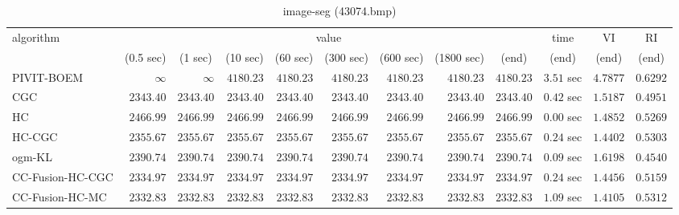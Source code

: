 \begin{table}[H]
\scriptsize
\centering
\caption{image-seg (43074.bmp)}
\label{tab:anytimetable-image-seg-43074.bmp}
\begin{tabular}{lrrrrrrrrrrr}
\toprule
           algorithm &                                   \multicolumn{8}{c}{value} & \multicolumn{1}{c}{time}    & \multicolumn{1}{c}{VI}  & \multicolumn{1}{c}{RI} \\  
\cmidrule(lr){2-9}\cmidrule(lr){10-10} \cmidrule(lr){11-11} \cmidrule(lr){12-12}   
                     & \multicolumn{1}{c}{(0.5 sec)} & \multicolumn{1}{c}{(1 sec)} & \multicolumn{1}{c}{(10 sec)} & \multicolumn{1}{c}{(60 sec)} & \multicolumn{1}{c}{(300 sec)} & \multicolumn{1}{c}{(600 sec)} & \multicolumn{1}{c}{(1800 sec)} & \multicolumn{1}{c}{(end)} & \multicolumn{1}{c}{(end)}    & \multicolumn{1}{c}{(end)}   & \multicolumn{1}{c}{(end)}  \\ \midrule 
          PIVIT-BOEM & $\infty$ & $\infty$ & $      4180.23$ & $      4180.23$ & $      4180.23$ & $      4180.23$ & $      4180.23$ & $      4180.23$ & $         3.51$ sec    & $       4.7877$  & $       0.6292$ \\ 
                 CGC & $      2343.40$ & $      2343.40$ & $      2343.40$ & $      2343.40$ & $      2343.40$ & $      2343.40$ & $      2343.40$ & $      2343.40$ & $         0.42$ sec    & $       1.5187$  & $       0.4951$ \\ 
                  HC & $      2466.99$ & $      2466.99$ & $      2466.99$ & $      2466.99$ & $      2466.99$ & $      2466.99$ & $      2466.99$ & $      2466.99$ & $         0.00$ sec    & $       1.4852$  & $       0.5269$ \\ 
              HC-CGC & $      2355.67$ & $      2355.67$ & $      2355.67$ & $      2355.67$ & $      2355.67$ & $      2355.67$ & $      2355.67$ & $      2355.67$ & $         0.24$ sec    & $       1.4402$  & $       0.5303$ \\ 
              ogm-KL & $      2390.74$ & $      2390.74$ & $      2390.74$ & $      2390.74$ & $      2390.74$ & $      2390.74$ & $      2390.74$ & $      2390.74$ & $         0.09$ sec    & $       1.6198$  & $       0.4540$ \\ 
    CC-Fusion-HC-CGC & $      2334.97$ & $      2334.97$ & $      2334.97$ & $      2334.97$ & $      2334.97$ & $      2334.97$ & $      2334.97$ & $      2334.97$ & $         0.24$ sec    & $       1.4456$  & $       0.5159$ \\ 
     CC-Fusion-HC-MC & $      2332.83$ & $      2332.83$ & $      2332.83$ & $      2332.83$ & $      2332.83$ & $      2332.83$ & $      2332.83$ & $      2332.83$ & $         1.09$ sec    & $       1.4105$  & $       0.5312$ \\ 

\end{tabular}
\end{table}
